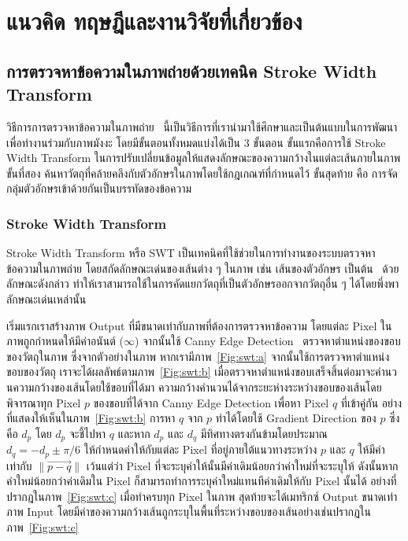 \chapter{แนวคิด ทฤษฎีและงานวิจัยที่เกี่ยวข้อง}
\label{chapter:related-theory}

\section{การตรวจหาข้อความในภาพถ่ายด้วยเทคนิค Stroke Width Transform}

วิธีการการตรวจหาข้อความในภาพถ่าย~\cite{5540041} นี้เป็นวิธีการที่เรานำมาใช้ศึกษาและเป็นต้นแบบในการพัฒนาเพื่อทำงานร่วมกับภาพมังงะ  โดยมีขั้นตอนทั้งหมดแบ่งได้เป็น 3 ขั้นตอน ขั้นแรกคือการใช้ Stroke Width Transform ในการปรับเปลี่ยนข้อมูลให้แสดงลักษณะของความกว้างในแต่ละเส้นภายในภาพ ขั้นที่สอง ค้นหาวัตถุที่คล้ายคลึงกับตัวอักษรในภาพโดยใช้กฎเกณฑ์ที่กำหนดไว้ ขั้นสุดท้าย คือ การจัดกลุ่มตัวอักษรเข้าด้วยกันเป็นบรรทัดของข้อความ

\subsection{Stroke Width Transform}

Stroke Width Transform หรือ SWT เป็นเทคนิคที่ใช้ช่วยในการทำงานของระบบตรวจหาข้อความในภาพถ่าย โดยสกัดลักษณะเด่นของเส้นต่าง ๆ ในภาพ เช่น เส้นของตัวอักษร เป็นต้น~\cite{5540041} ด้วยลักษณะดังกล่าว ทำให้เราสามารถใช้ในการคัดแยกวัตถุที่เป็นตัวอักษรออกจากวัตถุอื่น ๆ ได้โดยพึ่งพาลักษณะเด่นเหล่านั้น

เริ่มแรกเราสร้างภาพ Output ที่มีขนาดเท่ากับภาพที่ต้องการตรวจหาข้อความ โดยแต่ละ Pixel ในภาพถูกกำหนดให้มีค่าอนันต์ ($\infty$) จากนั้นใช้ Canny Edge Detection~\cite{4767851} ตรวจหาตำแหน่งของขอบของวัตถุในภาพ ซึ่งจากตัวอย่างในภาพ หากเรามีภาพ~\ref{Fig:swt:a} จากนั้นใช้การตรวจหาตำแหน่งขอบของวัตถุ เราจะได้ผลลัพธ์ตามภาพ~\ref{Fig:swt:b} เมื่อตรวจหาตำแหน่งขอบเสร็จสิ้นต่อมาจะคำนวนความกว้างของเส้นโดยใช้ขอบที่ได้มา ความกว้างคำนวนได้จากระยะห่างระหว่างขอบของเส้นโดยพิจารณาทุก Pixel $p$ ของขอบที่ได้จาก Canny Edge Detection เพื่อหา Pixel $q$ ที่เข้าคู่กัน อย่างที่แสดงให้เห็นในภาพ~\ref{Fig:swt:b} การหา $q$ จาก $p$ ทำได้โดยใช้ Gradient Direction ของ $p$ ซึ่งคือ $d_p$ โดย $d_p$ จะชี้ไปหา $q$ และหาก $d_p$ และ $d_q$ มีทิศทางตรงกันข้ามโดยประมาณ $d_q = -d_p \pm \pi/6$ ให้กำหนดค่าให้กับแต่ละ Pixel ที่อยู่ภายใต้แนวทางระหว่าง $p$ และ $q$ ให้มีค่าเท่ากับ $\| \overrightarrow{p-q}\|$ เว้นแต่ว่า Pixel ที่จะระบุค่าให้นั้นมีค่าเดิมน้อยกว่าค่าใหม่ที่จะระบุให้ ดังนั้นหากค่าใหม่น้อยกว่าค่าเดิมใน Pixel ก็สามารถทำการระบุค่าใหม่แทนทีค่าเดิมให้กับ Pixel นั้นได้ อย่างที่ปรากฎในภาพ~\ref{Fig:swt:c} เมื่อทำครบทุก Pixel ในภาพ สุดท้ายจะได้เมทริกซ์ Output ขนาดเท่าภาพ Input โดยมีค่าของความกว้างเส้นถูกระบุในพื้นที่ระหว่างขอบของเส้นอย่างเช่นปรากฏในภาพ~\ref{Fig:swt:c}

